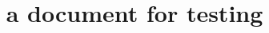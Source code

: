 \documentclass[a4paper,beeees]{hwhProblem}
\begin{document}
\title{a document for testing}
\end{document}
